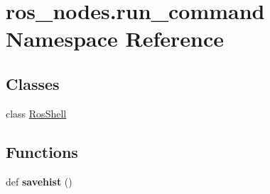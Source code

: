 \hypertarget{namespaceros__nodes_1_1run__command}{}\section{ros\+\_\+nodes.\+run\+\_\+command Namespace Reference}
\label{namespaceros__nodes_1_1run__command}
\subsection*{Classes}
\begin{DoxyCompactItemize}
\item 
class \hyperlink{classros__nodes_1_1run__command_1_1RosShell}{Ros\+Shell}
\end{DoxyCompactItemize}
\subsection*{Functions}
\begin{DoxyCompactItemize}
\item 
def {\bfseries savehist} ()\hypertarget{namespaceros__nodes_1_1run__command_a44ae85a6af66c15b637d821a7acad6bd}{}\label{namespaceros__nodes_1_1run__command_a44ae85a6af66c15b637d821a7acad6bd}

\end{DoxyCompactItemize}
